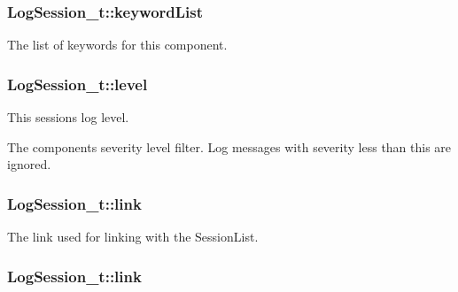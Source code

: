 \subsubsection[{\texorpdfstring{keyword\+List}{keywordList}}]{ Log\+Session\+\_\+t\+::keyword\+List}\hypertarget{struct_log_session__t_aac5bd69dba895e16085b305969837690}{}\label{struct_log_session__t_aac5bd69dba895e16085b305969837690}


The list of keywords for this component. 

\subsubsection[{\texorpdfstring{level}{level}}]{ Log\+Session\+\_\+t\+::level}\hypertarget{struct_log_session__t_aed5303e384a65afde9120d33d35500ea}{}\label{struct_log_session__t_aed5303e384a65afde9120d33d35500ea}


This session\textquotesingle{}s log level. 

The component\textquotesingle{}s severity level filter. Log messages with severity less than this are ignored. 
\subsubsection[{\texorpdfstring{link}{link}}]{ Log\+Session\+\_\+t\+::link}\hypertarget{struct_log_session__t_a375df6ec6d99194c2b55ca0588ff7610}{}\label{struct_log_session__t_a375df6ec6d99194c2b55ca0588ff7610}


The link used for linking with the Session\+List. 

\subsubsection[{\texorpdfstring{link}{link}}]{ Log\+Session\+\_\+t\+::link}\hypertarget{struct_log_session__t_ad3ef78eb14df999c16e47eebbc91efbd}{}\label{struct_log_session__t_ad3ef78eb14df999c16e47eebbc91efbd}


